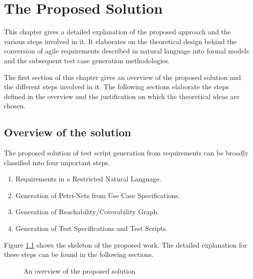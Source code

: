 \chapter{The Proposed Solution}
This chapter gives a detailed explanation of the proposed approach and the various steps involved in it. It elaborates on the theoretical design behind the conversion of agile requirements described in natural language into formal models and the subsequent test case generation methodologies.
 
The first section of this chapter gives an overview of the proposed solution and the different steps involved in it. The following sections elaborate the steps defined in the overview and the justification on which the theoretical ideas are chosen.


\section{Overview of the solution}
The proposed solution of test script generation from requirements can be broadly classified into four important steps.
\begin{enumerate}
\item Requirements in a Restricted Natural Language.
\item Generation of Petri-Nets from Use Case Specifications.
\item Generation of Reachability/Coverability Graph.
\item Generation of Test Specifications and Test Scripts.
\end{enumerate}
Figure \ref{fig:proposed_solution2} shows the skeleton of the proposed work. The detailed explanation for these steps can be found in the following sections.

\begin{figure}[]
\centering
{}
\caption{An overview of the proposed solution}
\label{fig:proposed_solution2}
\end{figure}


